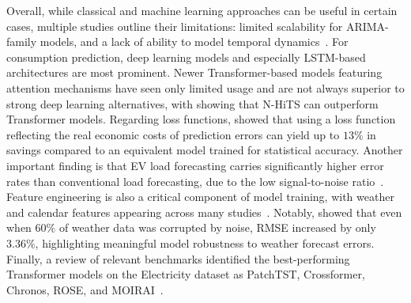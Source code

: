 Overall, while classical and machine learning approaches can be useful in certain cases,
multiple studies outline their limitations: limited scalability for ARIMA-family models,
and a lack of ability to model temporal dynamics~\cite{kyriakopoulos2025}. For consumption
prediction, deep learning models and especially LSTM-based architectures are most
prominent. Newer Transformer-based models featuring attention mechanisms have seen only
limited usage and are not always superior to strong deep learning alternatives, with
\citet{vanetten2024} showing that N-HiTS can outperform Transformer models. Regarding
loss functions, \citet{zhang2021} showed that using a loss function reflecting the real
economic costs of prediction errors can yield up to $13\%$ in savings compared to an
equivalent model trained for statistical accuracy. Another important finding is that EV
load forecasting carries significantly higher error rates than conventional load
forecasting, due to the low signal-to-noise ratio~\cite{vanetten2024}. Feature engineering
is also a critical component of model training, with weather and calendar features
appearing across many studies~\cite{sinitsyn2023, ye2024, moveh2025a}. Notably,
\citet{cai2019} showed that even when $60\%$ of weather data was corrupted by noise, RMSE
increased by only $3.36\%$, highlighting meaningful model robustness to weather forecast
errors. Finally, a review of relevant benchmarks identified the best-performing
Transformer models on the Electricity dataset as PatchTST, Crossformer, Chronos, ROSE,
and MOIRAI~\cite{li2024tsfmbench, qiu2024tfb}.